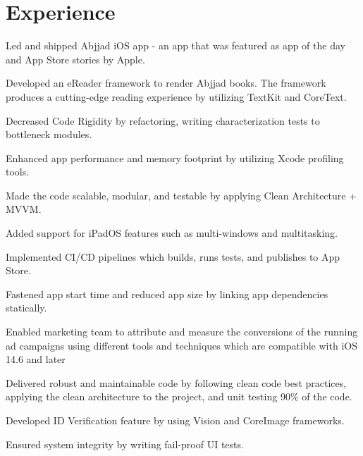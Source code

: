 \documentclass[]{deedy-resume-openfont}
\begin{document}
\begin{minipage}[t]{0.66\textwidth} 


\section{Experience}
\vspace{\topsep} 
\vspace{\topsep} %
\begin{tightemize}
\item Led and shipped Abjjad iOS app - an app that was featured as app of the day and  App Store stories by Apple. 
\item Developed an eReader framework to render Abjjad books. The framework produces a cutting-edge reading experience by utilizing TextKit and CoreText.
\item Decreased Code Rigidity by refactoring, writing characterization tests to bottleneck modules.
\item Enhanced app performance and memory footprint by utilizing Xcode profiling tools.
\item Made the code scalable, modular, and testable by applying Clean Architecture + MVVM.
\item Added support for iPadOS features such as multi-windows and multitasking.
\item Implemented CI/CD pipelines which builds, runs tests, and publishes to App Store.
\item Fastened app start time and reduced app size by linking app dependencies statically.
\item Enabled marketing team to attribute and measure the conversions of the running ad campaigns using different tools and techniques which are compatible with iOS 14.6 and later 
\end{tightemize}
\sectionsep


\vspace{\topsep} %
\begin{tightemize}
\item Delivered robust and maintainable code by following clean code best practices, applying the clean architecture to the project, and unit testing 90\% of the code.
\item Developed ID Verification feature by using Vision and CoreImage frameworks.
\item Ensured system integrity by writing fail-proof UI tests.
\end{tightemize}
\sectionsep


\end{minipage}
\end{document}

